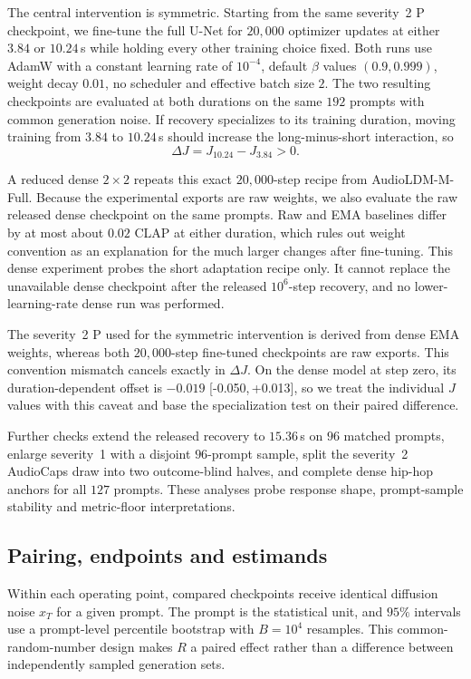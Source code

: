 \documentclass{article}
\newcommand{\ci}[2]{[{#1},\,{#2}]}
\begin{document}
The central intervention is symmetric. Starting from the same severity~2 P checkpoint, we fine-tune the full U-Net for $20{,}000$ optimizer updates at either $3.84$ or $10.24$\,s while holding every other training choice fixed. Both runs use AdamW with a constant learning rate of $10^{-4}$, default $\beta$ values $(0.9,0.999)$, weight decay $0.01$, no scheduler and effective batch size $2$. The two resulting checkpoints are evaluated at both durations on the same $192$ prompts with common generation noise. If recovery specializes to its training duration, moving training from $3.84$ to $10.24$\,s should increase the long-minus-short interaction, so
\begin{equation}
\Delta J = J_{10.24}-J_{3.84}>0.
\end{equation}

A reduced dense $2\times2$ repeats this exact $20{,}000$-step recipe from AudioLDM-M-Full. Because the experimental exports are raw weights, we also evaluate the raw released dense checkpoint on the same prompts. Raw and EMA baselines differ by at most about $0.02$ CLAP at either duration, which rules out weight convention as an explanation for the much larger changes after fine-tuning. This dense experiment probes the short adaptation recipe only. It cannot replace the unavailable dense checkpoint after the released $10^{6}$-step recovery, and no lower-learning-rate dense run was performed.

The severity~2 P used for the symmetric intervention is derived from dense EMA weights, whereas both $20{,}000$-step fine-tuned checkpoints are raw exports. This convention mismatch cancels exactly in $\Delta J$. On the dense model at step zero, its duration-dependent offset is $-0.019$ \ci{-0.050}{+0.013}, so we treat the individual $J$ values with this caveat and base the specialization test on their paired difference.

Further checks extend the released recovery to $15.36$\,s on $96$ matched prompts, enlarge severity~1 with a disjoint $96$-prompt sample, split the severity~2 AudioCaps draw into two outcome-blind halves, and complete dense hip-hop anchors for all $127$ prompts. These analyses probe response shape, prompt-sample stability and metric-floor interpretations.

\subsection{Pairing, endpoints and estimands}
Within each operating point, compared checkpoints receive identical diffusion noise $x_T$ for a given prompt. The prompt is the statistical unit, and $95\%$ intervals use a prompt-level percentile bootstrap with $B=10^{4}$ resamples. This common-random-number design makes $R$ a paired effect rather than a difference between independently sampled generation sets.
\end{document}
